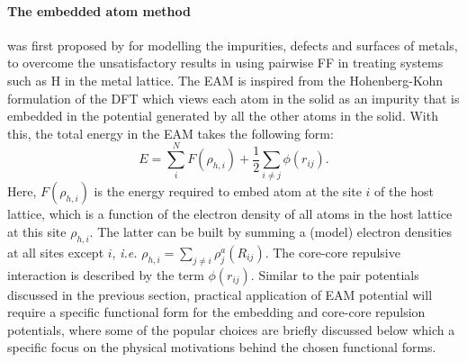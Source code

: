 \paragraph{\textbf{The embedded atom method}} was first proposed by \citet{daw1984embedded} for modelling the impurities, defects and surfaces of metals, to overcome the unsatisfactory results in using pairwise FF in treating systems such as H in the metal lattice. The EAM is inspired from the Hohenberg-Kohn formulation of the DFT\cite{hohenberg1964inhomogeneous} which views each atom in the solid as an impurity that is embedded in the potential generated by all the other atoms in the solid. With this, the total energy in the EAM takes the following form:
\begin{equation}\label{eq:EAM_total_energy}
E=\sum_{i}^N F(\rho_{h,i})+\frac{1}{2}\sum_{i\neq j}\phi(r_{ij}).
\end{equation}
Here, $F(\rho_{h,i})$ is the energy required to embed atom at the site $i$ of the host lattice, which is a function of the electron density of all atoms in the host lattice at this site $\rho_{h,i}$. The latter can be built by summing a (model) electron densities at all sites except $i$, \emph{i.e.} $\rho_{h,i}=\sum_{j\neq i}\rho_j^a(R_{ij})$. The  core-core repulsive interaction is described by the term $\phi(r_{ij})$. Similar to the pair potentials discussed in the previous section, practical application of EAM potential will require a specific functional form for the embedding and core-core repulsion potentials,  where some of the popular choices are briefly discussed below which a specific focus on the physical motivations behind the chosen functional forms.

